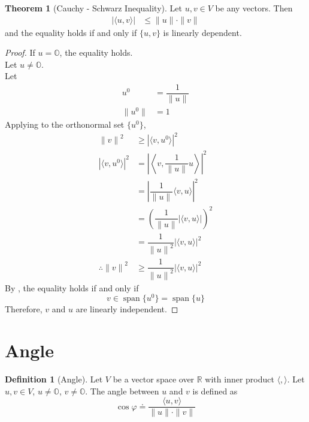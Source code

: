 \documentclass[fleqn, a4paper, 12pt]{article}
\DeclareMathOperator{\vspan}{\mathrm{span}} %
\theoremstyle{definition}
\newtheorem{definition}{Definition} %
\theoremstyle{theorem}
\newtheorem{theorem}{Theorem} %
\theoremstyle{remark}
\numberwithin{corollary}{theorem}
\numberwithin{equation}{theorem}
\begin{document}
\begin{theorem}[Cauchy - Schwarz Inequality]\label{Cauchy - Schwarz Inequality}
	Let $u, v \in V$ be any vectors. Then
	\begin{align*}
		| \langle u, v \rangle | &\leq \| u \| \cdot \| v \|
	\end{align*}
	and the equality holds if and only if $\{u, v\}$ is linearly dependent.
\end{theorem}

\begin{proof}
	If $u = \mathbb{O}$, the equality holds.\\
	Let $u \neq \mathbb{O}$.\\
	Let
	\begin{align*}
		u^0 &= \dfrac{1}{\| u \|}\\
		\| u^0 \| &= 1
	\end{align*}
	Applying  to the orthonormal set $\{u^0\}$,
	\begin{align*}
		{\| v \|}^2 & \geq {| \langle v, u^0 \rangle |}^2\\
		{| \langle v, u^0 \rangle |}^2 &= {\left\lvert \left\langle v, \dfrac{1}{\| u \|} u \right\rangle \right\rvert}^2\\
		&= {\left\lvert \dfrac{1}{\| u \|} \langle v, u \rangle \right\rvert}^2\\
		&= \left( \dfrac{1}{\| u \|} | \langle v, u \rangle | \right)^2\\
		&= \dfrac{1}{{\| u \|}^2} {|\langle v, u \rangle|}^2\\
		\therefore {\| v \|}^2 &\geq \dfrac{1}{{\| u \|}^2} {|\langle v, u \rangle|}^2
	\end{align*}
	By , the equality holds if and only if
	\begin{equation*}
		v \in \vspan \{u^0\} = \vspan \{u\}
	\end{equation*}
	Therefore, $v$ and $u$ are linearly independent.
\end{proof}

\section{Angle}

\begin{definition}[Angle]
	Let $V$ be a vector space over $\mathbb{R}$ with inner product $\langle , \rangle$. Let $u, v \in V$, $u \neq \mathbb{O}$, $v \neq \mathbb{O}$. The angle between $u$ and $v$ is defined as
	\begin{equation*}
		\cos \varphi \doteq \dfrac{\langle u, v \rangle}{\| u \| \cdot \| v \|}
	\end{equation*}
\end{definition}
\end{document}

